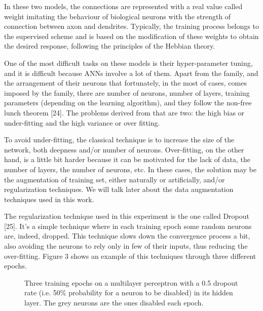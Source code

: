 In these two models, the connections are represented with a real value called weight imitating the behaviour of biological neurons with the strength of connection between axon and dendrites. Typically, the training process belongs to the supervised scheme and is based on the modification of these weights to obtain the desired response, following the principles of the Hebbian theory.

One of the most difficult tasks on these models is their hyper-parameter tuning, and it is difficult because ANNs involve a lot of them. Apart from the family, and the arrangement of their neurons that fortunately, in the most of cases, comes imposed by the family, there are number of neurons, number of layers, training parameters (depending on the learning algorithm), and they follow the non-free lunch theorem [24]. The problems derived from that are two: the high bias or under-fitting and the high variance or over fitting.

To avoid under-fitting, the classical technique is to increase the size of the network, both deepness and/or number of neurons. Over-fitting, on the other hand, is a little bit harder because it can be motivated for the lack of data, the number of layers, the number of neurons, etc. In these cases, the solution may be the augmentation of training set, either naturally or artificially, and/or regularization techniques. We will talk later about the data augmentation techniques used in this work.

The regularization technique used in this experiment is the one called Dropout [25]. It’s a simple technique where in each training epoch some random neurons are, indeed, dropped. This technique slows down the convergence process a bit, also avoiding the neurons to rely only in few of their inputs, thus reducing the over-fitting. Figure 3 shows an example of this techniques through three different epochs.


\begin{figure*}
	\centering
	\qquad
	\qquad
	\caption{Three training epochs on a multilayer perceptron with a 0.5 dropout rate (i.e. 50\% probability for a neuron to be disabled) in its hidden layer. The grey neurons are the ones disabled each epoch.}
	\label{fig:dropout-example}
\end{figure*}

